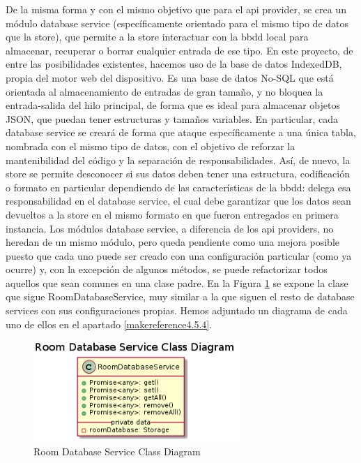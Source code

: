 \vspace{0.5cm}

De la misma forma y con el mismo objetivo que para el api provider, se crea un módulo database service (específicamente orientado para el mismo tipo de datos que la store), que permite a la store interactuar con la \gls{bbdd} local para almacenar, recuperar o borrar cualquier entrada de ese tipo. En este proyecto, de entre las posibilidades existentes, hacemos uso de la base de datos IndexedDB, propia del motor web del dispositivo. Es una base de datos No-SQL que está orientada al almacenamiento de entradas de gran tamaño, y no bloquea la entrada-salida del hilo principal, de forma que es ideal para almacenar objetos JSON, que puedan tener estructuras y tamaños variables. En particular, cada database service se creará de forma que ataque específicamente a una única tabla, nombrada con el mismo tipo de datos, con el objetivo de reforzar la mantenibilidad del código y la separación de responsabilidades. Así, de nuevo, la store se permite desconocer si sus datos deben tener una estructura, codificación o formato en particular dependiendo de las características de la \gls{bbdd}: delega esa responsabilidad en el database service, el cual debe garantizar que los datos sean devueltos a la store en el mismo formato en que fueron entregados en primera instancia. 
Los módulos database service, a diferencia de los api providers, no heredan de un mismo módulo, pero queda pendiente como una mejora posible puesto que cada uno puede ser creado con una configuración particular (como ya ocurre) y, con la excepción de algunos métodos, se puede refactorizar todos aquellos que sean comunes en una clase padre. En la Figura \ref{fig:database-service} se expone la clase que sigue RoomDatabaseService, muy similar a la que siguen el resto de database services con sus configuraciones propias. Hemos adjuntado un diagrama de cada uno de ellos en el apartado \ref{makereference4.5.4}.


\begin{figure}[hbt!]
\centering
\includegraphics[height=1.5in]{figures/diagrams/front/architecture/database-service.png}
\caption[app-data]{Room Database Service Class Diagram\footnotemark}
\label{fig:database-service}
\end{figure}

